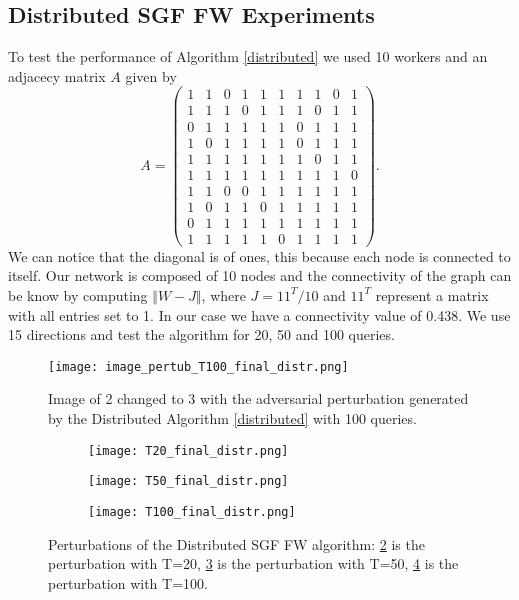 \subsection{Distributed SGF FW Experiments}
To test the performance of Algorithm \ref{distributed} we used 10 workers and an adjacecy matrix $A$ given by
\[ A =
\begin{pmatrix}
1& 1& 0& 1& 1& 1& 1& 1& 0& 1\\
1& 1& 1& 0& 1& 1& 1& 0& 1& 1\\
0& 1& 1& 1& 1& 1& 0& 1& 1& 1\\
1& 0& 1& 1& 1& 1& 0& 1& 1& 1\\
1& 1& 1& 1& 1& 1& 1& 0& 1& 1\\
1& 1& 1& 1& 1& 1& 1& 1& 1& 0\\
1& 1& 0& 0& 1& 1& 1& 1& 1& 1\\
1& 0& 1& 1& 0& 1& 1& 1& 1& 1\\
0& 1& 1& 1& 1& 1& 1& 1& 1& 1\\
1& 1& 1& 1& 1& 0& 1& 1& 1& 1
\end{pmatrix}
.\]
We can notice that the diagonal is of ones, this because each node is connected to itself. Our network is composed of
10 nodes and the connectivity of the graph can be know by computing $\Vert W- J \Vert$, where $J= 11^T/10$ and $11^T$
represent a matrix with all entries set to 1. In our case we have a connectivity value of 0.438. We use 15 directions
and test the algorithm for 20, 50 and 100 queries.

\begin{figure}[htbp]
	\centering
	\texttt{[image: image\_pertub\_T100\_final\_distr.png]}
	\caption{Image of 2 changed to 3 with the adversarial perturbation generated by the Distributed Algorithm \ref{distributed} with 100 queries.}
	\label{fig:distributed}
\end{figure}

\begin{figure}%
	\centering
	\begin{subfigure}[b]{0.15\textwidth}
		\centering
		\texttt{[image: T20\_final\_distr.png]}
		\caption{}
		\label{fig:decentralized_perturbation}
	\end{subfigure}
	\hfill
	\begin{subfigure}[b]{0.15\textwidth}
		\texttt{[image: T50\_final\_distr.png]}
		\caption{}
		\label{fig:variance-reduce_perturbation}
	\end{subfigure}
	\hfill
	\begin{subfigure}[b]{0.15\textwidth}
		\texttt{[image: T100\_final\_distr.png]}
		\caption{}
		\label{fig:distributed_perturbation}
	\end{subfigure}
	\caption{Perturbations of the Distributed SGF FW algorithm: \ref{fig:decentralized_perturbation} is the perturbation with T=20, \ref{fig:variance-reduce_perturbation} is the perturbation with T=50, \ref{fig:distributed_perturbation} is the perturbation with T=100.}
	\label{fig:perturbations}
\end{figure}